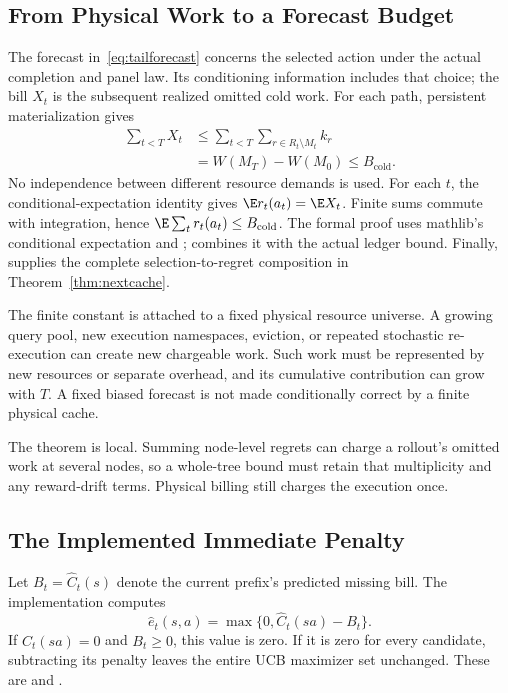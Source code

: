 \subsection{From Physical Work to a Forecast Budget}
The forecast in~\eqref{eq:tailforecast} concerns the selected action under the actual completion and panel law. Its conditioning information includes that choice; the bill $X_t$ is the subsequent realized omitted cold work. For each path, persistent materialization gives
\begin{equation}
\begin{split}
\sum_{t<T}X_t
&\le\sum_{t<T}\sum_{r\in R_t\setminus M_t}k_r\\
&=W(M_T)-W(M_0)\le B_{\mathrm{cold}}.
\end{split}
\end{equation}
No independence between different resource demands is used. For each $t$, the conditional-expectation identity gives $\E r_t(a_t)=\E X_t$. Finite sums commute with integration, hence $\E\sum_t r_t(a_t)\le B_{\mathrm{cold}}$. The formal proof uses mathlib's conditional expectation and ;  combines it with the actual ledger bound. Finally,  supplies the complete selection-to-regret composition in Theorem~\ref{thm:nextcache}.

The finite constant is attached to a fixed physical resource universe. A growing query pool, new execution namespaces, eviction, or repeated stochastic re-execution can create new chargeable work. Such work must be represented by new resources or separate overhead, and its cumulative contribution can grow with $T$. A fixed biased forecast is not made conditionally correct by a finite physical cache.

The theorem is local. Summing node-level regrets can charge a rollout's omitted work at several nodes, so a whole-tree bound must retain that multiplicity and any reward-drift terms. Physical billing still charges the execution once.

\subsection{The Implemented Immediate Penalty}
Let $B_t=\widehat C_t(s)$ denote the current prefix's predicted missing bill. The implementation computes
\begin{equation}
\widehat e_t(s,a)=\max\{0,\widehat C_t(sa)-B_t\}.
\label{eq:immediateimpl}
\end{equation}
If $\widehat C_t(sa)=0$ and $B_t\ge0$, this value is zero. If it is zero for every candidate, subtracting its penalty leaves the entire UCB maximizer set unchanged. These are  and .

